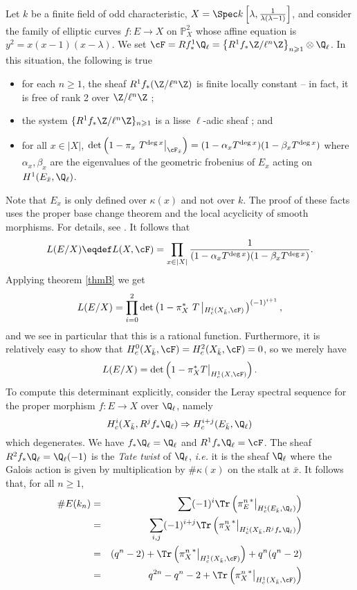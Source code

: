 Let $k$ be a finite field of odd characteristic, $X=\Spec k\left[\lambda, \frac{1}{\lambda(\lambda-1)}\right]$, and consider the family of elliptic curves  $f: E\to X$ on $\mathbb P^2_X$ whose affine equation is $y^2 = x(x-1)(x-\lambda)$. We set $\cF = Rf_*^1\Q_\ell = \left\{R^1f_*\Z/\ell^n\Z\right\}_{n\geqslant 1}\otimes \Q_\ell$. In this situation, the following is true
\begin{itemize}	
\item for each $n \geqslant 1$, the sheaf $R^1f_*(\Z/\ell^n\Z)$ is finite locally constant -- in fact, it is free of rank 2 over $\Z/\ell^n\Z$ ;
\item the system $\{R^1f_*\Z/\ell^n\Z\}_{n\geqslant 1}$ is a lisse $\ell$-adic sheaf ; and
\item for all $x\in |X|$, $\det\left(1-\pi_x\ T^{\deg x}\big|_{\cF_{\bar x}}\right) = (1-\alpha_x T^{\deg x})(1-\beta_x T^{\deg x })$ where $\alpha_x, \beta_x$ are the eigenvalues of the geometric frobenius of $E_x$ acting on $H^1(E_{\bar x}, \Q_\ell)$. 
\end{itemize}
Note that $E_x$ is only defined over $\kappa(x)$ and not over $k$. The proof of these facts uses the proper base change theorem and the local acyclicity of smooth morphisms. For details, see \cite{SGA4.5}. It follows that
$$
L(E/X) \eqdef L(X, \cF) = \prod_{x\in |X|} \frac{1}{(1-\alpha_xT^{\deg x})(1-\beta_xT^{\deg x })} .
$$
Applying theorem \ref{thmB} we get
$$
L(E/X) = \prod_{i=0}^2\det\left(1-\pi_X^*\ T\left|_{H_c^i(X_{\bar k}, \cF)}\right.\right)^{(-1)^{i+1}},
$$
and we see in particular that this is a rational function. Furthermore, it is relatively easy to show that $H_c^0(X_{\bar k}, \cF) = H_c^2(X_{\bar k}, \cF) = 0$, so we merely have
$$
L(E/X) = \det\left(1-\pi_X^*T\big|_{H_c^1(X, \cF)}\right).
$$
To compute this determinant explicitly, consider the Leray spectral sequence for the proper morphism $f:E \to X$ over $\Q_\ell$, namely
$$
H_c^i(X_{\bar k}, R^jf_*\Q_\ell) \Rightarrow H_c^{i+j}(E_{\bar k},\Q_\ell)
$$
which degenerates. We have $f_*\Q_\ell=\Q_\ell$ and $R^1f_*\Q_\ell = \cF$. The sheaf $R^2f_*\Q_\ell = \Q_\ell(-1)$ is the \emph{Tate twist} of $\Q_\ell$, {\it i.e.} it is the sheaf $\Q_\ell$ where the Galois action is given by multiplication by $\#\kappa(x)$ on the stalk at $\bar x$.  It follows that,  for all $n\geqslant 1$,
\begin{eqnarray*}
\# E(k_n) & = & \sum(-1)^i\Tr\left({\pi_E^n}^*\big|_{H_c^i(E_{\bar k}, \Q_\ell)}\right)\\
& = & \sum_{i, j}(-1)^{i+j}\Tr\left({\pi^n_X}^*\big|_{H_c^i(X_{\bar k}, R^jf_*\Q_\ell)}\right)\\
& = & (q^n-2) + \Tr\left( {\pi_X^n}^*\big|_{H_c^1(X_{\bar k}, \cF)}\right)+ q^n (q^n-2)\\
& = & q^{2n} - q^n-2 +\Tr\left( {\pi_X^n}^*\big|_{H_c^1(X_{\bar k}, \cF)}\right)
\end{eqnarray*}

